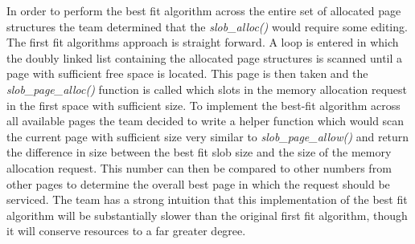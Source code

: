 \documentclass[10pt,onecolumn,draftclsnofoot]{IEEEtran} %
\begin{document}
\begin{singlespace}
  \normalfont \indent In order to perform the best fit algorithm across the entire set of allocated page structures the team determined that the \textit{slob\_alloc()} would require some editing. The first fit algorithms approach is straight forward. A loop is entered in which the doubly linked list containing the allocated page structures is scanned until a page with sufficient free space is located. This page is then taken and the \textit{slob\_page\_alloc()} function is called which slots in the memory allocation request in the first space with sufficient size. To implement the best-fit algorithm across all available pages the team decided to write a helper function which would scan the current page with sufficient size very similar to \textit{slob\_page\_allow()} and return the difference in size between the best fit slob size and the size of the memory allocation request. This number can then be compared to other numbers from other pages to determine the overall best page in which the request should be serviced. The team has a strong intuition that this implementation of the best fit algorithm will be substantially slower than the original first fit algorithm, though it will conserve resources to a far greater degree.  


\end{singlespace}
\end{document}
